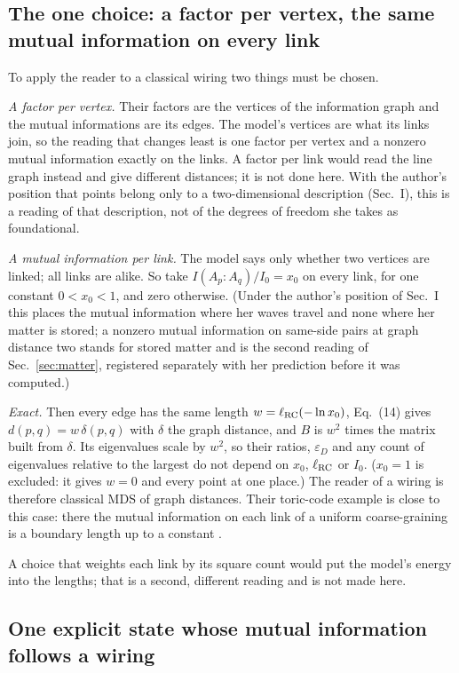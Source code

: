\documentclass[aps,pre,10pt,twocolumn,superscriptaddress,nofootinbib]{revtex4-2}
\begin{document}
\subsection{The one choice: a factor per vertex, the same mutual information on every link}

To apply the reader to a classical wiring two things must be chosen.

\emph{A factor per vertex.} Their factors are the vertices of the information graph and the mutual informations are
its edges. The model's vertices are what its links join, so the reading that changes least is one factor per vertex
and a nonzero mutual information exactly on the links. A factor per link would read the line graph instead and give
different distances; it is not done here. With the author's position that points belong only to a two-dimensional
description (Sec.~I), this is a reading of that description, not of the degrees of freedom she takes as
foundational.

\emph{A mutual information per link.} The model says only whether two vertices are linked; all links are alike. So
take $I(A_p:A_q)/I_0=x_0$ on every link, for one constant $0<x_0<1$, and zero otherwise. (Under the author's
position of Sec.~I this places the mutual information where her waves travel and none where her matter is stored; a
nonzero mutual information on same-side pairs at graph distance two stands for stored matter and is the second reading
of Sec.~\ref{sec:matter}, registered separately with her prediction before it was computed.)

\emph{Exact.} Then every edge has the same length $w=\ell_{\rm RC}(-\ln x_0)$, Eq.~(14) gives $d(p,q)=w\,\delta(p,q)$
with $\delta$ the graph distance, and $B$ is $w^2$ times the matrix built from $\delta$. Its eigenvalues scale by $w^2$,
so their ratios, $\varepsilon_D$ and any count of eigenvalues relative to the largest do not depend on $x_0$,
$\ell_{\rm RC}$ or $I_0$. ($x_0=1$ is excluded: it gives $w=0$ and every point at one place.) The reader of a wiring
is therefore classical MDS of graph distances. Their toric-code example is close to this case: there the mutual
information on each link of a uniform coarse-graining is a boundary length up to a constant \cite{CCM16}.

A choice that weights each link by its square count would put the model's energy into the lengths; that is a second,
different reading and is not made here.

\subsection{One explicit state whose mutual information follows a wiring}
\end{document}
